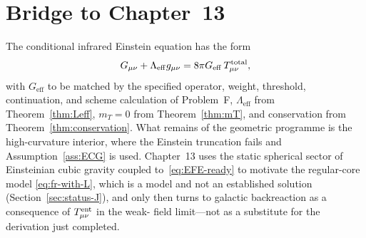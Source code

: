 \section{Bridge to Chapter~13}
\label{sec:ch12-bridge}

The conditional infrared Einstein equation has the form
\begin{equation}
  \label{eq:EFE-ready}
  G_{\mu\nu}+\Lambda_{\mathrm{eff}}g_{\mu\nu}
  =8\pi G_{\mathrm{eff}}\,T_{\mu\nu}^{\mathrm{total}},
\end{equation}
with \(G_{\mathrm{eff}}\) to be matched by the specified
operator, weight, threshold, continuation, and scheme calculation
of Problem~F, \(\Lambda_{\mathrm{eff}}\) from
Theorem~\ref{thm:Leff},
\(m_T=0\) from Theorem~\ref{thm:mT}, and conservation from
Theorem~\ref{thm:conservation}. What remains of the geometric
programme is the high-curvature interior, where the Einstein
truncation fails and Assumption~\ref{ass:ECG} is used. Chapter~13
uses the static spherical sector of Einsteinian cubic gravity
coupled to~\eqref{eq:EFE-ready} to motivate the regular-core model
\eqref{eq:fr-with-L}, which is a model and not an established
solution (Section~\ref{sec:status-J}), and only then turns to galactic
backreaction as a consequence of \(T^{\mathrm{ent}}_{\mu\nu}\) in the weak-
field limit---not as a substitute for the derivation just
completed.